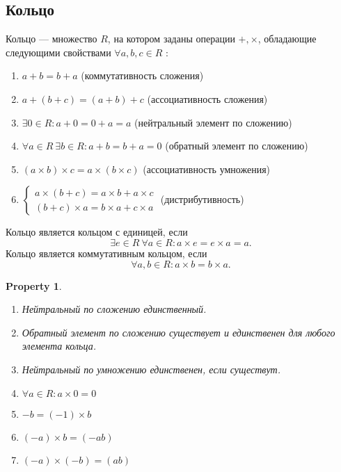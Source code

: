 \documentclass[11pt]{book}
\theoremstyle{definition}
\theoremstyle{plain}
\theoremstyle{plain}
\newtheorem*{prop}{Property}
\theoremstyle{definition}
\theoremstyle{remark}
\begin{document}
\subsection{Кольцо}
\begin{defn}
    {\sf Кольцо} --- множество $ R$, на котором заданы операции  $ +, \times $, обладающие следующими свойствами $\forall a, b,c \in R$ :
    \begin{enumerate}[noitemsep]
	\item $ a + b = b + a$ (коммутативность  сложения)
	\item  $ a + (b+c) = (a+b) + c$ (ассоциативность сложения)
	\item  $ \exists 0 \in R: a+0 = 0 + a = a$ (нейтральный элемент по сложению)
	\item $ \forall a \in R ~ \exists b \in R: a+b = b+ a= 0$ (обратный элемент по сложению)
	\item $ (a \times b) \times c = a \times (b \times c)$ (ассоциативность умножения)
	\item $
	    \begin{cases}
		a \times (b + c) = a \times  b + a \times c \\
		(b + c) \times a = b \times a + c \times a
	    \end{cases}$ (дистрибутивность)
    \end{enumerate}
    Кольцо является {\sf кольцом с единицей}, если
    $$ \exists  e \in  R ~ \forall  a \in R: a \times e = e \times  a = a.$$
    Кольцо является {\sf коммутативным кольцом}, если
    \[
	\forall a, b \in R: a \times b = b \times a
    .\]
\end{defn}
\begin{prop}
    $ $
    \begin{enumerate}[noitemsep]
	\item Нейтральный по сложению единственный.
	\item Обратный элемент по сложению существует и единственен для любого элемента кольца.
	\item Нейтральный по умножению единственен, если существут.
	\item $ \forall a \in R: a \times 0 = 0$
	\item $ -b = (-1) \times b$
	\item $ (-a) \times b = (-ab)$
	\item $ (-a) \times (-b)= (ab)$
    \end{enumerate}
\end{prop}
\end{document}
